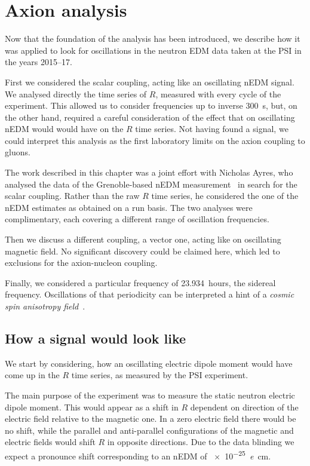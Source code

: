 \chapter{Axion analysis}
\label{ch:axion-analysis}

Now that the foundation of the analysis has been introduced, we describe how it was applied to look for oscillations in the neutron EDM data taken at the PSI in the years 2015--17.

First we considered the scalar coupling, acting like an oscillating nEDM signal. We analysed directly the time series of $R$, measured with every cycle of the experiment. This allowed us to consider frequencies up to inverse \SI{300}{\second}, but, on the other hand, required a careful consideration of the effect that on oscillating nEDM would would have on the $R$ time series. Not having found a signal, we could interpret this analysis as the first laboratory limits on the axion coupling to gluons.

The work described in this chapter was a joint effort with Nicholas Ayres, who analysed the data of the Grenoble-based nEDM measurement~\cite{AyresThesis} in search for the scalar coupling. Rather than the raw $R$ time series, he considered the one of the nEDM estimates as obtained on a run basis. The two analyses were complimentary, each covering a different range of oscillation frequencies.

Then we discuss a different coupling, a vector one, acting like on oscillating magnetic field. No significant discovery could be claimed here, which led to exclusions for the axion-nucleon coupling.

Finally, we considered a particular frequency of \num{23.934}~hours, the sidereal frequency.
Oscillations of that periodicity can be interpreted a hint of a \emph{cosmic spin anisotropy field}~\cite{Altarev2009}.



\section{How a signal would look like}
We start by considering, how an oscillating electric dipole moment would have come up in the $R$ time series, as measured by the PSI experiment.

The main purpose of the experiment was to measure the static neutron electric dipole moment. This would appear as a shift in $R$ dependent on direction of the electric field relative to the magnetic one. In a zero electric field there would be no shift, while the parallel and anti-parallel configurations of the magnetic and electric fields would shift $R$ in opposite directions. Due to the data blinding
we expect a pronounce shift corresponding to an nEDM of \SI{e-25}{\elementarycharge\centi\meter}.

